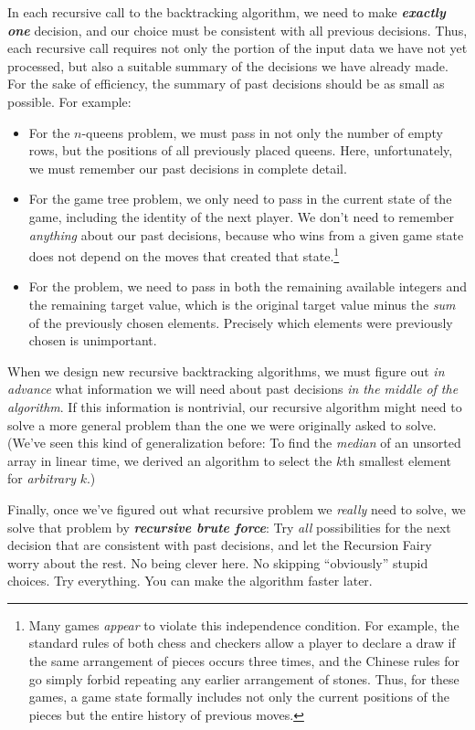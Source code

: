 In each recursive call to the backtracking algorithm, we need to make \textbf{\textit{exactly one}} decision, and our choice must be consistent with all previous decisions.
Thus, each recursive call requires not only the portion of the input data we have not yet processed, but also a suitable summary of the decisions we have already made.
For the sake of efficiency, the summary of past decisions should be as small as possible.
For example:
\begin{itemize}
\item For the $n$-queens problem, we must pass in not only the number of empty rows, but the positions of all previously placed queens.
Here, unfortunately, we must remember our past decisions in complete detail.
\item For the game tree problem, we only need to pass in the current state of the game, including the identity of the next player.
We don’t need to remember \textit{anything} about our past decisions, because who wins from a given game state does not depend on the moves that created that state.\footnote{Many games \textit{appear} to violate this independence condition. For example, the standard rules of both chess and checkers allow a player to declare a draw if the same arrangement of pieces occurs three times, and the Chinese rules for go simply forbid repeating any earlier arrangement of stones. Thus, for these games, a game state formally includes not only the current positions of the pieces but the entire history of previous moves.}
\item For the  problem, we need to pass in both the remaining available integers and the remaining target value, which is the original target value minus the \textit{sum} of the previously chosen elements.
Precisely which elements were previously chosen is unimportant.
\end{itemize}
When we design new recursive backtracking algorithms, we must figure out \textit{in advance} what information we will need about past decisions \textit{in the middle of the algorithm}.
If this information is nontrivial, our recursive algorithm might need to solve a more general problem than the one we were originally asked to solve.
(We’ve seen this kind of generalization before: To find the \textit{median} of an unsorted array in linear time, we derived an algorithm to select the $k$th smallest element for \textit{arbitrary} $k$.)

Finally, once we’ve figured out what recursive problem we \textit{really} need to solve, we solve that problem by \textbf{\textit{recursive brute force}}: Try \textit{all} possibilities for the next decision that are consistent with past decisions, and let the Recursion Fairy worry about the rest.
No being clever here.
No skipping “obviously” stupid choices.
Try everything.
You can make the algorithm faster later.

